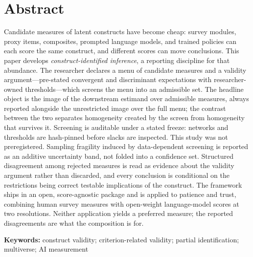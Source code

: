 \documentclass[10pt,letterpaper]{article}
\begin{document}
\section*{Abstract}
Candidate measures of latent constructs have become cheap: survey modules, proxy items, composites, prompted language models, and trained policies can each score the same construct, and different scores can move conclusions.
This paper develops \emph{construct-identified inference}, a reporting discipline for that abundance.
The researcher declares a menu of candidate measures and a validity argument---pre-stated convergent and discriminant expectations with researcher-owned thresholds---which screens the menu into an admissible set.
The headline object is the image of the downstream estimand over admissible measures, always reported alongside the unrestricted image over the full menu; the contrast between the two separates homogeneity created by the screen from homogeneity that survives it.
Screening is auditable under a stated freeze: networks and thresholds are hash-pinned before slacks are inspected.
This study was not preregistered.
Sampling fragility induced by data-dependent screening is reported as an additive uncertainty band, not folded into a confidence set.
Structured disagreement among rejected measures is read as evidence about the validity argument rather than discarded, and every conclusion is conditional on the restrictions being correct testable implications of the construct.
The framework ships in an open, score-agnostic package and is applied to patience and trust, combining human survey measures with open-weight language-model scores at two resolutions.
Neither application yields a preferred measure; the reported disagreements are what the composition is for.

\noindent\textbf{Keywords:}
construct validity; criterion-related validity; partial identification; multiverse; AI measurement
\end{document}
